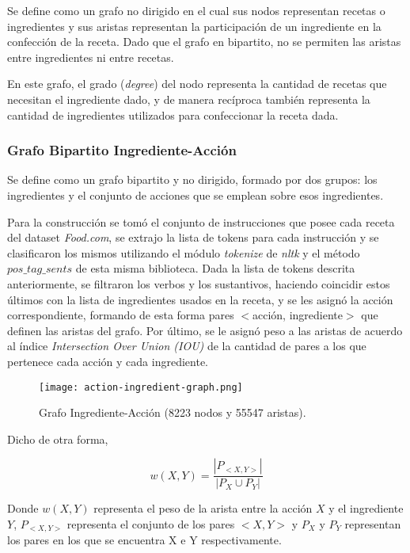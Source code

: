 \documentclass[
	a4paper, %
	10pt, %
	unnumberedsections, %
	twoside, %
]{LTJournalArticle}
\begin{document}
Se define como un grafo no dirigido en el cual sus nodos representan
recetas o ingredientes y sus aristas representan la participación de un ingrediente en la confección de la receta.
Dado que el grafo en bipartito, no se permiten las aristas entre ingredientes ni entre recetas.

En este grafo, el grado (\textit{degree}) del nodo representa la cantidad de recetas que necesitan
el ingrediente dado, y de manera recíproca también representa la cantidad de ingredientes utilizados para 
confeccionar la receta dada.

\subsubsection{Grafo Bipartito Ingrediente-Acción}

Se define como un grafo bipartito y no dirigido, formado por dos grupos: los ingredientes y el conjunto de acciones que se emplean sobre esos ingredientes. 

Para la construcción se tomó el conjunto de instrucciones que posee cada receta del dataset \textit{Food.com}, se extrajo la lista de tokens para cada instrucción y se clasificaron los mismos utilizando el módulo \emph{tokenize} de \textit{nltk} y el método \emph{$pos\_tag\_sents$} de esta misma biblioteca. Dada la lista de tokens descrita anteriormente, se filtraron los verbos y los sustantivos, haciendo coincidir estos últimos con la lista de ingredientes usados en la receta, y se les asignó la acción correspondiente, formando de esta forma pares $<$acción, ingrediente$>$ que definen las aristas del grafo. Por último, se le asignó peso a las aristas de acuerdo al índice \textit{Intersection Over Union (IOU)} de la cantidad de pares a los que pertenece cada acción y cada ingrediente. 

\begin{figure}
	\texttt{[image: action-ingredient-graph.png]}
	\caption{Grafo Ingrediente-Acción (8223 nodos y 55547 aristas).}
	\label{fig:encoder_decoder_small}
\end{figure}

Dicho de otra forma,

$$w(X, Y) = \frac{|P_{<X,Y>}|}{|P_X \cup P_Y|}$$

Donde $w(X,Y)$ representa el peso de la arista entre la acción $X$ y el ingrediente $Y$, $P_{<X,Y>}$ representa el conjunto de los pares $<X,Y>$ y $P_X$ y $P_Y$ representan los pares en los que se encuentra X e Y respectivamente.
\end{document}
